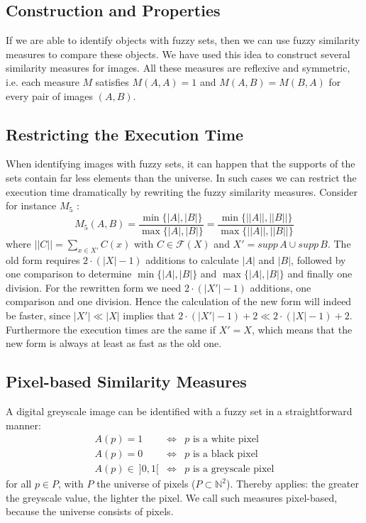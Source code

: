 \documentclass[twocolumn]{phdsymp} %
\begin{document}
\subsection{Construction and Properties}

If we are able to identify objects with fuzzy sets, then we can use fuzzy similarity
measures to compare these objects. We have used this idea to construct several similarity 
measures for images. All these measures are reflexive and symmetric, i.e. each measure $M$ 
satisfies $M(A,A)=1$ and $M(A,B)=M(B,A)$ for every pair of images $(A,B)$.

\subsection{Restricting the Execution Time}

When identifying images with fuzzy sets, it can happen that the supports of the
sets contain far less elements than the universe. In such cases we can restrict the
execution time dra\-ma\-ti\-cal\-ly by rewriting the fuzzy similarity measures. Consider for instance
$M_5$ \cite{vanderweken:similariteitsmaten}: 
\begin{displaymath}
M_{5}(A,B) = \frac{\min\{|A|,|B|\}}{\max\{|A|,|B|\}} = \frac{\min\{||A||,||B||\}}{\max\{||A||,||B||\}}
\end{displaymath}
where $||C||=\sum_{x\in X'}C(x)$ with $C \in {\mathcal{F}}(X)$ and $X'=supp\,A \cup supp\,B$.
The old form requires $2 \cdot (|X|-1)$ additions to calculate $|A|$ and $|B|$, 
followed by one comparison to determine $\min\{|A|,|B|\}$ and $\max\{|A|,|B|\}$ and finally 
one division. For the rewritten form we need $ 2 \cdot (|X'|-1)$ additions, one comparison
and one division. Hence the calculation of the new form will indeed be faster, since 
$|X'| \ll |X|$ implies that $2 \cdot (|X'|-1) + 2 \ll 2 \cdot (|X|-1) + 2$. 
Furthermore the execution times are the same if $X'=X$, which means that the new form is
always at least as fast as the old one.

\subsection{Pixel-based Similarity Measures}

A digital greyscale image can be identified with a fuzzy set in a straightforward manner:
\begin{displaymath}
\begin{array}{rcl}
A(p) = 1 & \iff & p \text{ is a white pixel} \\
A(p) = 0 & \iff & p \text{ is a black pixel} \\
A(p) \in\ ]0,1[ & \iff & p \textrm{ is a greyscale pixel}
\end{array}
\end{displaymath}
for all $p \in P$, with $P$ the universe of pixels ($P \subset {\mathbb{N}}^{2}$). Thereby 
applies: the greater the greyscale value, the lighter the pixel. We call such measures 
pixel-based, because the universe consists of pixels.
\end{document}
